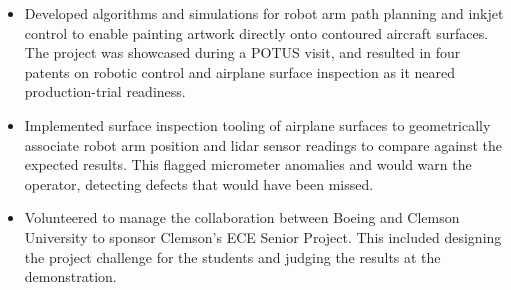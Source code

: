 \documentclass[10pt,a4paper,ragged2e,withhyper]{altacv}
\begin{document}
\begin{paracol}{2}
\begin{itemize}
\item Developed algorithms and simulations for robot arm path planning and inkjet control to enable painting artwork directly onto contoured aircraft surfaces. The project was showcased during a POTUS visit, and resulted in four patents on robotic control and airplane surface inspection as it neared production-trial readiness.
\item Implemented surface inspection tooling of airplane surfaces to geometrically associate robot arm position and lidar sensor readings to compare against the expected results. This flagged micrometer anomalies and would warn the operator, detecting defects that would have been missed.
\item Volunteered to manage the collaboration between Boeing and Clemson University to sponsor Clemson’s ECE Senior Project. This included designing the project challenge for the students and judging the results at the demonstration.
\end{itemize}





\medskip





\switchcolumn


\end{paracol}
\end{document}
